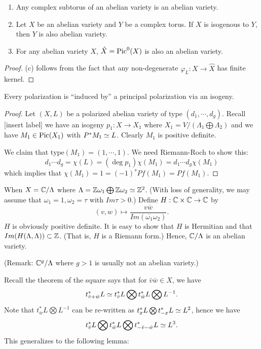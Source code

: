 \begin{corollary}
\noindent
\begin{enumerate}
\item Any complex subtorus of an abelian variety is an abelian variety.
\item Let $X$ be an abelian variety and $Y$ be a complex torus. If $X$ is isogenous to $Y$, then $Y$ is also abelian variety. 
\item For any abelian variety $X$, $\hat{X}=\operatorname{Pic}^0(X)$ is also an abelian variety.
\end{enumerate}
\end{corollary}

\begin{proof}
(c) follows from the fact that any non-degenerate $\varphi_L:X\to \hat{X}$ has finite kernel.
\end{proof}

\begin{lemma}
Every polarization is ``induced by'' a principal polarization via an isogeny. 
\end{lemma}

\begin{proof}
Let $(X,L)$ be a polarized abelian variety of type $(d_1,\cdots, d_g)$. Recall [insert label] we have an isogeny $p_1: X\to X_1$ where $X_1=V/(\Lambda_1\bigoplus \Lambda_2)$ and we have $M_1\in \operatorname{Pic}(X_1)$ with $P^* M_1\simeq L$. Clearly $M_1$ is positive definite. 

We claim that $\text{type}(M_1)=(1,\cdots,1)$. We need Riemann-Roch to show this:
\[
d_1\cdots d_g = \chi(L)=(\deg p_1)\chi(M_1)=d_1\cdots d_g \chi(M_1)
\]
which implies that $\chi(M_1)=1=(-1)^s Pf(M_1)=Pf(M_1)$. 
\end{proof}

\begin{example}
When $X={\mathbb C}/\Lambda$ where $\Lambda={\mathbb Z} \omega_1 \bigoplus {\mathbb Z} \omega_2\simeq {\mathbb Z}^2$. (With loss of generality, we may assume that $\omega_1=1, \omega_2 = \tau$ with $Im \tau>0$.) Define $H:{\mathbb C}\times {\mathbb C}\to {\mathbb C}$ by 
$$(v,w)\mapsto \frac{v\overline{ w}}{Im(\overline{\omega_1}\omega_2)}.$$
$H$ is obviously positive definite.
It is easy to show that $H$ is Hermitian and that $Im(H(\Lambda,\Lambda))\subset {\mathbb Z}$. (That is, $H$ is a Riemann form.) Hence, ${\mathbb C}/\Lambda$ is an abelian variety. 

(Remark: ${\mathbb C}^g/\Lambda$ where $g>1$ is usually not an abelian variety.)
\end{example}

Recall the theorem of the square says that for $\bar{v}\bar{w}\in X$, we have
\[
t^*_{\bar{v}+\bar{w}}L \simeq t^*_{\bar{v}}L \bigotimes t^*_{\bar{w}}L \bigotimes L^{-1}.
\]
Note that $t^*_{\bar{w}}L \bigotimes L^{-1}$ can be re-written as $t^*_xL\bigotimes t^*_{-x}L\simeq L^2$, hence we have 
\[
t^*_{\bar{v}}L \bigotimes t^*_{\bar{w}}L \bigotimes t^*_{-\bar{v}-\bar{w}}L \simeq L^3.
\]
This generalizes to the following lemma:

